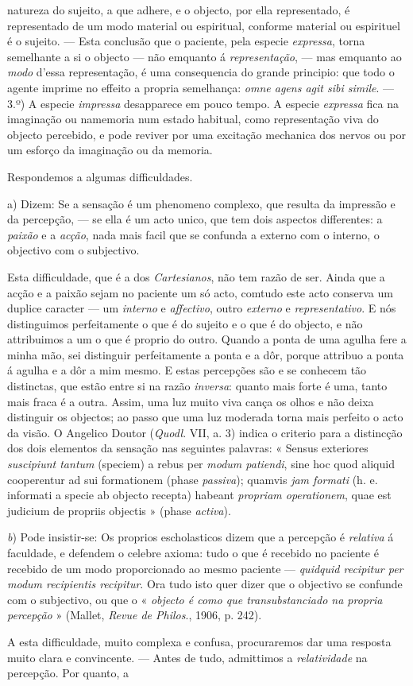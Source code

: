 natureza do sujeito, a que adhere, e o objecto, por ella representado, é representado de um modo material ou espiritual, conforme material ou espirituel é o sujeito. --- Esta conclusão que o paciente, pela especie \emph{expressa}, torna semelhante a si o objecto --- não emquanto á \emph{representação}, --- mas emquanto ao \emph{modo} d'essa representação, é uma consequencia do grande principio: que todo o agente imprime no effeito a propria semelhança: \emph{omne agens agit sibi simile}. --- 3.º) A especie \emph{impressa} desapparece em pouco tempo. A especie \emph{expressa} fica na imaginação ou namemoria num estado habitual, como representação viva do objecto percebido, e pode reviver por uma excitação mechanica dos nervos ou por um esforço da imaginação ou da memoria.\par Respondemos a algumas difficuldades.\par a) Dizem: Se a sensação é um phenomeno complexo, que resulta da impressão e da percepção, --- se ella é um acto unico, que tem dois aspectos differentes: a \emph{paixão} e a \emph{acção}, nada mais facil que se confunda a externo com o interno, o objectivo com o subjectivo.\par Esta difficuldade, que é a dos \emph{Cartesianos}, não tem razão de ser. Ainda que a acção e a paixão sejam no paciente um só acto, comtudo este acto conserva um duplice caracter --- um \emph{interno} e \emph{affectivo}, outro \emph{externo} e \emph{representativo}. E nós distinguimos perfeitamente o que é do sujeito e o que é do objecto, e não attribuimos a um o que é proprio do outro. Quando a ponta de uma agulha fere a minha mão, sei distinguir perfeitamente a ponta e a dôr, porque attribuo a ponta á agulha e a dôr a mim mesmo. E estas percepções são e se conhecem tão distinctas, que estão entre si na razão \emph{inversa}: quanto mais forte é uma, tanto mais fraca é a outra. Assim, uma luz muito viva cança os olhos e não deixa distinguir os objectos; ao passo que uma luz moderada torna mais perfeito o acto da visão. O Angelico Doutor (\emph{Quodl}. VII, a. 3) indica o criterio para a distincção dos dois elementos da sensação nas seguintes palavras: « Sensus exteriores \emph{suscipiunt tantum} (speciem) a rebus per \emph{modum patiendi}, sine hoc quod aliquid cooperentur ad sui formationem (phase \emph{passiva}); quamvis \emph{jam formati} (h. e. informati a specie ab objecto recepta) habeant \emph{propriam operationem}, quae est judicium de propriis objectis » (phase \emph{activa}).\par \emph{b}) Pode insistir-se: Os proprios escholasticos dizem que a percepção é \emph{relativa} á faculdade, e defendem o celebre axioma: tudo o que é recebido no paciente é recebido de um modo proporcionado ao mesmo paciente --- \emph{quidquid recipitur per modum recipientis recipitur}. Ora tudo isto quer dizer que o objectivo se confunde com o subjectivo, ou que o « \emph{objecto é como que transubstanciado na propria percepção} » (Mallet, \emph{Revue de Philos}., 1906, p. 242).\par A esta difficuldade, muito complexa e confusa, procuraremos dar uma resposta muito clara e convincente. --- Antes de tudo, admittimos a \emph{relatividade} na percepção. Por quanto, a 